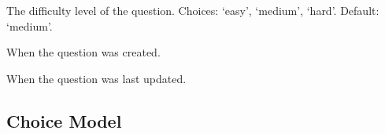 \documentclass[letterpaper,10pt,english]{sphinxmanual}
\begin{document}
\begin{fulllineitems}
\begin{fulllineitems}
\end{fulllineitems}


\begin{fulllineitems}
\label{\detokenize{models:Question.difficulty}}
\pysigstartsignatures
{}
\pysigstopsignatures
\sphinxAtStartPar
The difficulty level of the question.
Choices: ‘easy’, ‘medium’, ‘hard’.
Default: ‘medium’.

\end{fulllineitems}


\begin{fulllineitems}
\label{\detokenize{models:Question.created_at}}
\pysigstartsignatures
{}
\pysigstopsignatures
\sphinxAtStartPar
When the question was created.

\end{fulllineitems}


\begin{fulllineitems}
\label{\detokenize{models:Question.updated_at}}
\pysigstartsignatures
{}
\pysigstopsignatures
\sphinxAtStartPar
When the question was last updated.

\end{fulllineitems}


\end{fulllineitems}



\subsection{Choice Model}
\label{\detokenize{models:choice-model}}
\end{document}
